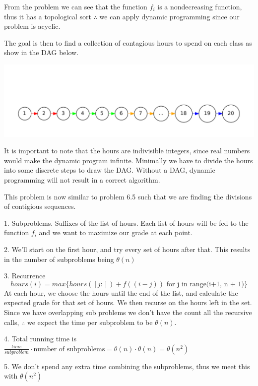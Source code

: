 \documentclass[12pt]{article}
\newenvironment{problem}[2][Problem]{\begin{trivlist}
\item[\hskip \labelsep {\bfseries #1}\hskip \labelsep {\bfseries #2.}]}{\end{trivlist}}
\begin{document}
\begin{problem}{6.20}
 
    From the problem we can see that the function $f_i$ is a nondecreasing
    function, thus it has a topological sort $\therefore$ we can apply dynamic
    programming since our problem is acyclic.

    The goal is then to find a collection of contagious hours to spend on each
    class as show in the DAG below.

    \includegraphics[width=\textwidth]{6_20.pdf}

    It is important to note that the hours are indivisible integers, since real
    numbers would make the dynamic program infinite. Minimally we have to divide
    the hours into some discrete steps to draw the DAG. Without a DAG, dynamic
    programming will not result in a correct algorithm. 

    This problem is now similar to problem 6.5 such that we are finding the
    divisions of contigious sequences. 

    1. Subproblems. Suffixes of the list of hours. Each list of hours will be
       fed to the function $f_i$ and we want to maximize our grade at each
       point.

    2. We'll start on the first hour, and try every set of hours after that.
       This results in the number of subproblems being $\theta(n)$

    3. Recurrence
    \begin{equation}
        hours(i) = max\{ hours([j:]) + f( (i-j) ) \text{ for j in range(i+1,
            n + 1)}\}
    \end{equation}
    At each hour, we choose the hours until the end of the list, and calculate
    the expected grade for that set of hours. We then recurse on the hours left
    in the set. Since we have overlapping sub problems we don't have the count
    all the recursive calls, $\therefore$ we expect the time per subproblem to
    be $\theta(n)$.

    4. Total running time is $\frac{time}{subproblem} \cdot \text{number of subproblems} = \theta(n) \cdot \theta(n) = \theta(n^2)$

    5. We don't spend any extra time combining the subproblems, thus we meet
       this with $\theta(n^2)$


\end{problem}
\end{document}
